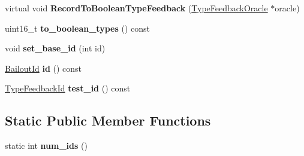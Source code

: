 \begin{DoxyCompactItemize}
\item 
virtual void {\bfseries Record\+To\+Boolean\+Type\+Feedback} (\hyperlink{classv8_1_1internal_1_1_type_feedback_oracle}{Type\+Feedback\+Oracle} $\ast$oracle)\hypertarget{classv8_1_1internal_1_1_expression_a2d0193f5251cfe78478331420c758bff}{}\label{classv8_1_1internal_1_1_expression_a2d0193f5251cfe78478331420c758bff}

\item 
uint16\+\_\+t {\bfseries to\+\_\+boolean\+\_\+types} () const \hypertarget{classv8_1_1internal_1_1_expression_a02642d37ec7d2c2c26b0e6ea1c1133c6}{}\label{classv8_1_1internal_1_1_expression_a02642d37ec7d2c2c26b0e6ea1c1133c6}

\item 
void {\bfseries set\+\_\+base\+\_\+id} (int id)\hypertarget{classv8_1_1internal_1_1_expression_ac46bb935b47dbddd8ac4a31a0ae26267}{}\label{classv8_1_1internal_1_1_expression_ac46bb935b47dbddd8ac4a31a0ae26267}

\item 
\hyperlink{classv8_1_1internal_1_1_bailout_id}{Bailout\+Id} {\bfseries id} () const \hypertarget{classv8_1_1internal_1_1_expression_afc64c0e0bef05c44204e1c302fa44117}{}\label{classv8_1_1internal_1_1_expression_afc64c0e0bef05c44204e1c302fa44117}

\item 
\hyperlink{classv8_1_1internal_1_1_type_feedback_id}{Type\+Feedback\+Id} {\bfseries test\+\_\+id} () const \hypertarget{classv8_1_1internal_1_1_expression_a8d03a18cbeee4debbe709e242c05dfc8}{}\label{classv8_1_1internal_1_1_expression_a8d03a18cbeee4debbe709e242c05dfc8}

\end{DoxyCompactItemize}
\subsection*{Static Public Member Functions}
\begin{DoxyCompactItemize}
\item 
static int {\bfseries num\+\_\+ids} ()\hypertarget{classv8_1_1internal_1_1_expression_a9316930f5aad65c6182c62fe5e8f5e99}{}\label{classv8_1_1internal_1_1_expression_a9316930f5aad65c6182c62fe5e8f5e99}

\end{DoxyCompactItemize}
